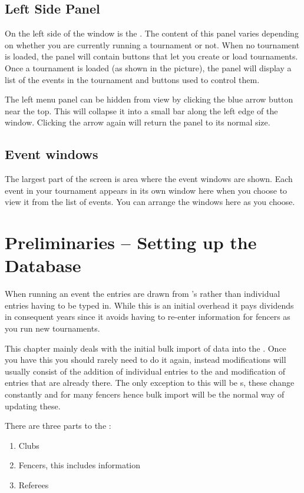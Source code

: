 \documentclass[a4paper,11pt]{memoir}
\begin{document}
\section{Left Side Panel}
On the left side of the window is the . The content of this panel varies depending on whether you are currently running a tournament or not. When no tournament is loaded, the panel will contain buttons that let you create or load tournaments. Once a tournament is loaded (as shown in the picture), the panel will display a list of the events in the tournament and buttons used to control them.

The left menu panel can be hidden from view by clicking the blue arrow button near the top. This will collapse it into a small bar along the left edge of the window. Clicking the arrow again will return the panel to its normal size.

\section{Event windows}
The largest part of the \fencingtime{} screen is area where the event windows are shown. Each event in your tournament appears in its own window here when you choose to view it from the list of events. You can arrange the windows here as you choose.

\chapter{Preliminaries -- Setting up the Database}
When running an event the entries are drawn from \fencingtime{}'s  rather than individual entries having to be typed in. While this is an initial overhead it pays dividends in consequent years since it avoids having to re-enter information for fencers as you run new tournaments. 

This chapter mainly deals with the initial bulk import of data into the . Once you have this you should rarely need to do it again, instead modifications will usually consist of the addition of individual entries to the  and modification of entries that are already there. The only exception to this will be s, these change constantly and for many fencers hence bulk import will be the normal way of updating these.

There are three parts to the :

\begin{enumerate}
 \item Clubs
 \item Fencers, this includes  information
 \item Referees
\end{enumerate}
\end{document}
